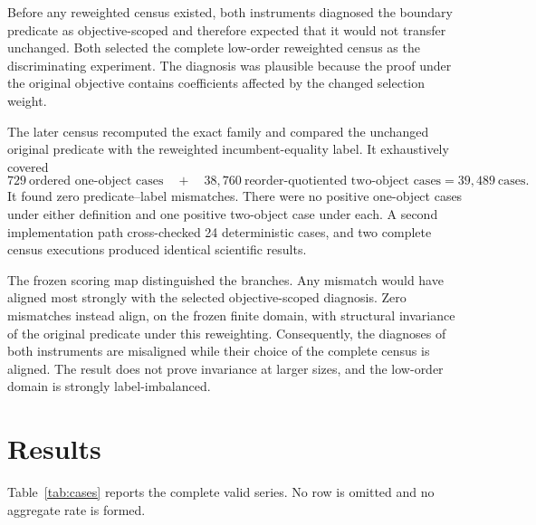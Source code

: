 \documentclass[10pt]{article}
\begin{document}
Before any reweighted census existed, both instruments diagnosed the boundary predicate as objective-scoped and therefore expected that it would not transfer unchanged. Both selected the complete low-order reweighted census as the discriminating experiment. The diagnosis was plausible because the proof under the original objective contains coefficients affected by the changed selection weight.

The later census recomputed the exact family and compared the unchanged original predicate with the reweighted incumbent-equality label. It exhaustively covered
\[
729\ \text{ordered one-object cases}
\quad+\quad
38{,}760\ \text{reorder-quotiented two-object cases}
=39{,}489\ \text{cases}.
\]
It found zero predicate--label mismatches. There were no positive one-object cases under either definition and one positive two-object case under each. A second implementation path cross-checked 24 deterministic cases, and two complete census executions produced identical scientific results.

The frozen scoring map distinguished the branches. Any mismatch would have aligned most strongly with the selected objective-scoped diagnosis. Zero mismatches instead align, on the frozen finite domain, with structural invariance of the original predicate under this reweighting. Consequently, the diagnoses of both instruments are misaligned while their choice of the complete census is aligned. The result does not prove invariance at larger sizes, and the low-order domain is strongly label-imbalanced.

\section{Results}

Table~\ref{tab:cases} reports the complete valid series. No row is omitted and no aggregate rate is formed.
\end{document}
